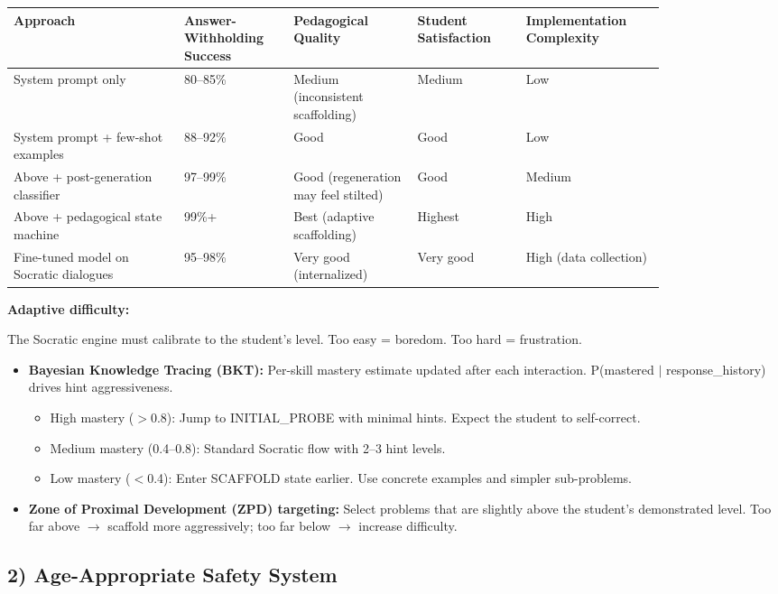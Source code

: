 \begin{tabular}{|p{0.22\linewidth}|p{0.14\linewidth}|p{0.16\linewidth}|p{0.14\linewidth}|p{0.18\linewidth}|}
\hline
\textbf{Approach} & \textbf{Answer-Withholding Success} & \textbf{Pedagogical Quality} & \textbf{Student Satisfaction} & \textbf{Implementation Complexity} \\
\hline
System prompt only & 80--85\% & Medium (inconsistent scaffolding) & Medium & Low \\
\hline
System prompt + few-shot examples & 88--92\% & Good & Good & Low \\
\hline
Above + post-generation classifier & 97--99\% & Good (regeneration may feel stilted) & Good & Medium \\
\hline
Above + pedagogical state machine & 99\%+ & Best (adaptive scaffolding) & Highest & High \\
\hline
Fine-tuned model on Socratic dialogues & 95--98\% & Very good (internalized) & Very good & High (data collection) \\
\hline
\end{tabular}

\textbf{Adaptive difficulty:}

The Socratic engine must calibrate to the student's level. Too easy = boredom. Too hard = frustration.

\begin{itemize}
  \item \textbf{Bayesian Knowledge Tracing (BKT):} Per-skill mastery estimate updated after each interaction. P(mastered $|$ response\_history) drives hint aggressiveness.
  \begin{itemize}
    \item High mastery ($>$0.8): Jump to INITIAL\_PROBE with minimal hints. Expect the student to self-correct.
    \item Medium mastery (0.4--0.8): Standard Socratic flow with 2--3 hint levels.
    \item Low mastery ($<$0.4): Enter SCAFFOLD state earlier. Use concrete examples and simpler sub-problems.
  \end{itemize}
  \item \textbf{Zone of Proximal Development (ZPD) targeting:} Select problems that are slightly above the student's demonstrated level. Too far above $\rightarrow$ scaffold more aggressively; too far below $\rightarrow$ increase difficulty.
\end{itemize}

\subsection*{2) Age-Appropriate Safety System}


